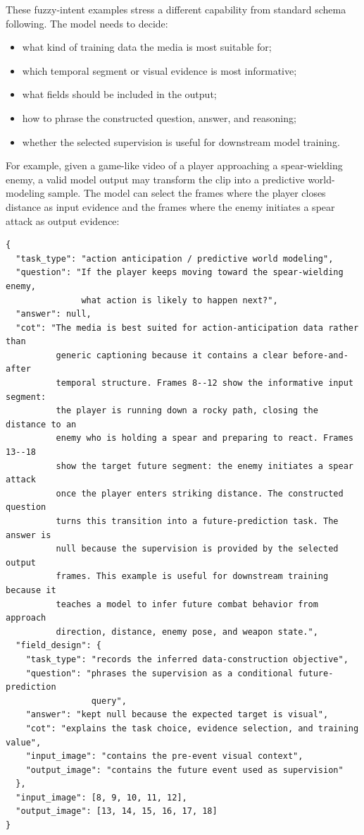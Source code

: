These fuzzy-intent examples stress a different capability from standard schema following. The model needs to decide:
\begin{itemize}
    \item what kind of training data the media is most suitable for;
    \item which temporal segment or visual evidence is most informative;
    \item what fields should be included in the output;
    \item how to phrase the constructed question, answer, and reasoning;
    \item whether the selected supervision is useful for downstream model training.
\end{itemize}

For example, given a game-like video of a player approaching a spear-wielding enemy, a valid model output may transform the clip into a predictive world-modeling sample. The model can select the frames where the player closes distance as input evidence and the frames where the enemy initiates a spear attack as output evidence:
\begin{verbatim}
{
  "task_type": "action anticipation / predictive world modeling",
  "question": "If the player keeps moving toward the spear-wielding enemy,
               what action is likely to happen next?",
  "answer": null,
  "cot": "The media is best suited for action-anticipation data rather than
          generic captioning because it contains a clear before-and-after
          temporal structure. Frames 8--12 show the informative input segment:
          the player is running down a rocky path, closing the distance to an
          enemy who is holding a spear and preparing to react. Frames 13--18
          show the target future segment: the enemy initiates a spear attack
          once the player enters striking distance. The constructed question
          turns this transition into a future-prediction task. The answer is
          null because the supervision is provided by the selected output
          frames. This example is useful for downstream training because it
          teaches a model to infer future combat behavior from approach
          direction, distance, enemy pose, and weapon state.",
  "field_design": {
    "task_type": "records the inferred data-construction objective",
    "question": "phrases the supervision as a conditional future-prediction
                 query",
    "answer": "kept null because the expected target is visual",
    "cot": "explains the task choice, evidence selection, and training value",
    "input_image": "contains the pre-event visual context",
    "output_image": "contains the future event used as supervision"
  },
  "input_image": [8, 9, 10, 11, 12],
  "output_image": [13, 14, 15, 16, 17, 18]
}
\end{verbatim}

